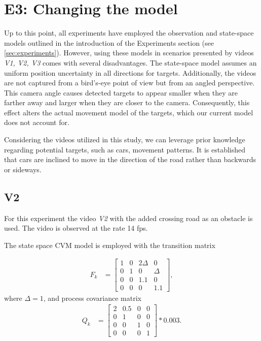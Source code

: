 \section{E3: Changing the model}
\renewcommand{\Ex}{E3}
Up to this point, all experiments have employed the observation and state-space models outlined in the introduction of the Experiments section (see \ref{sec:experiments}). However, using these models in scenarios presented by videos \textit{V1, V2, V3} comes with several disadvantages. The state-space model assumes an uniform position uncertainty in all directions for targets. Additionally, the videos are not captured from a bird's-eye point of view but from an angled perspective. This camera angle causes detected targets to appear smaller when they are farther away and larger when they are closer to the camera. Consequently, this effect alters the actual movement model of the targets, which our current model does not account for.


Considering the videos utilized in this study, we can leverage prior knowledge regarding potential targets, such as cars, movement patterns. It is established that cars are inclined to move in the direction of the road rather than backwards or sideways.
\subsection{V2}
\renewcommand{\Vs}{V2}
For this experiment the video \textit{V2} with the added crossing road as an obstacle is used. The video is observed at the rate 14 fps.

The state space CVM model is employed with the transition matrix

\begin{align}
    F_k &=
    \begin{bmatrix}
        1 & 0 & 2\Delta & 0\\
        0 & 1 & 0 & \Delta \\
        0 & 0 & 1.1 & 0 \\
        0 & 0 & 0 & 1.1
    \end{bmatrix},
\end{align}
where $\Delta = 1$,
and process covariance matrix
\begin{align}
    Q_k &=
    \begin{bmatrix}
        2 & 0.5 & 0 & 0\\
        0 & 1 & 0 & 0 \\
        0 & 0 & 1 & 0 \\
        0 & 0 & 0 & 1
    \end{bmatrix}
    * 0.003.
    \label{eq:exp_E3-V2_Q}
\end{align}


